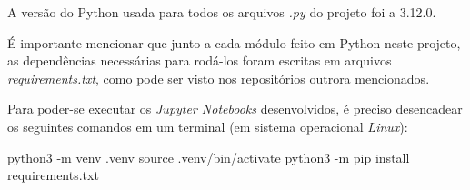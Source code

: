     A versão do Python usada para todos os arquivos \textit{.py} do projeto foi a 3.12.0.

    É importante mencionar que junto a cada módulo feito em Python neste projeto, as dependências necessárias para rodá-los foram escritas em arquivos \textit{requirements.txt}, como pode ser visto nos repositórios outrora mencionados.



    Para poder-se executar os \textit{Jupyter Notebooks} desenvolvidos, é preciso desencadear os seguintes comandos em um terminal (em sistema operacional \textit{Linux}):

\begin{python}
python3 -m venv .venv
source .venv/bin/activate
python3 -m pip install requirements.txt
\end{python}
    

     
     

    




